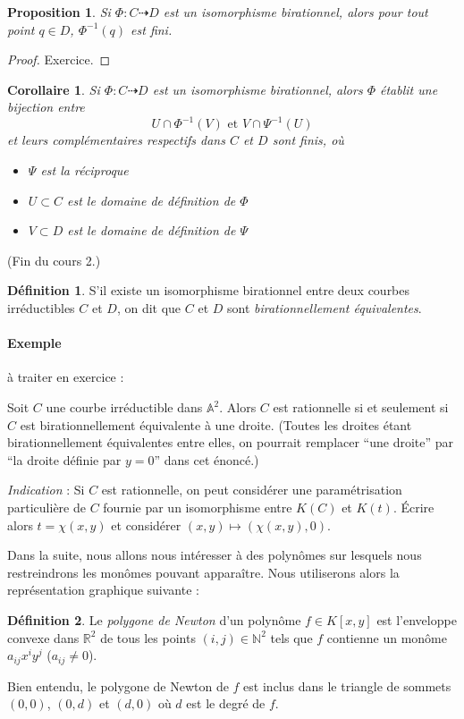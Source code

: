 \documentclass[a4paper, 11pt]{article}
\newtheorem{proposition}[théorème]{Proposition}
\newtheorem{corollaire}[théorème]{Corollaire}
\theoremstyle{definition}
\newtheorem{définition}{Définition}
\newcommand{\nat}{\mathbb{N}}
\newcommand{\real}{\mathbb{R}}
\newcommand{\aff}{\mathbb{A}}
\begin{document}
\begin{proposition}
  Si $\Phi : C \dashrightarrow D$ est un isomorphisme birationnel,
  alors pour tout point $q \in D$, $\Phi^{-1}(q)$ est fini.
\end{proposition}
\begin{proof}
  Exercice.
\end{proof}
\begin{corollaire}
  Si $\Phi : C \dashrightarrow D$ est un isomorphisme birationnel,
  alors $\Phi$ établit une bijection entre
  \[ U \cap \Phi^{-1}(V) \text{ et } V \cap \Psi^{-1}(U) \]
  et leurs complémentaires respectifs dans $C$ et $D$ sont finis, où
  \begin{itemize}
  \item $\Psi$ est la réciproque
  \item $U \subset C$ est le domaine de définition de $\Phi$
  \item $V \subset D$ est le domaine de définition de $\Psi$
  \end{itemize}
\end{corollaire}

(Fin du cours 2.)

\begin{définition}
  S'il existe un isomorphisme birationnel entre deux courbes
  irréductibles $C$ et $D$, on dit que $C$ et $D$ sont
  \emph{birationnellement équivalentes}.
\end{définition}

\paragraph{Exemple} à traiter en exercice :

Soit $C$ une courbe irréductible dans $\aff^2$. Alors $C$ est
rationnelle si et seulement si $C$ est birationnellement équivalente à
une droite. (Toutes les droites étant birationnellement équivalentes
entre elles, on pourrait remplacer \enquote{une droite} par
\enquote{la droite définie par $y=0$} dans cet énoncé.)

\textit{Indication} : Si $C$ est rationnelle, on peut considérer une
paramétrisation particulière de $C$ fournie par un isomorphisme entre
$K(C)$ et $K(t)$. Écrire alors $t = \chi(x,y)$ et considérer
$(x,y) \mapsto (\chi(x,y), 0)$.

Dans la suite, nous allons nous intéresser à des polynômes sur
lesquels nous restreindrons les monômes pouvant apparaître. Nous
utiliserons alors la représentation graphique suivante :
\begin{définition}
  Le \emph{polygone de Newton} d'un polynôme $f \in K[x,y]$ est
  l'enveloppe convexe dans $\real^2$ de tous les points
  $(i,j) \in \nat^2$ tels que $f$ contienne un monôme $a_{ij} x^i y^j$
  ($a_{ij} \neq 0$).
\end{définition}
Bien entendu, le polygone de Newton de $f$ est inclus dans le triangle
de sommets $(0,0)$, $(0,d)$ et $(d,0)$ où $d$ est le degré de $f$.
\end{document}
